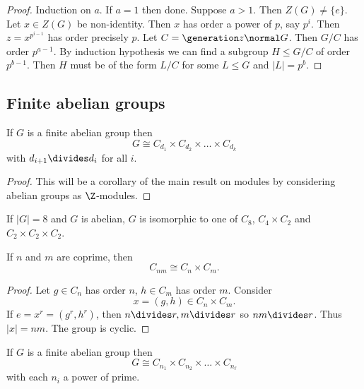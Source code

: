 \documentclass[a4paper]{article}
\begin{document}
\begin{proof}
  Induction on \(a\). If \(a = 1\) then done. Suppose \(a > 1\). Then \(Z(G) \neq \{e\}\). Let \(x \in Z(G)\) be non-identity. Then \(x\) has order  a power of \(p\), say \(p^i\). Then \(z = x^{p^{i - 1}}\) has order precisely \(p\). Let \(C = \generation z \normal G\). Then \(G/C\) has order \(p^{a - 1}\). By induction hypothesis we can find a subgroup \(H \leq G/C\) of order \(p^{b - 1}\). Then \(H\) must be of the form \(L/C\) for some \(L \leq G\) and \(|L| = p^b\).
\end{proof}

\subsection{Finite abelian groups}

\begin{theorem}
  If \(G\) is a finite abelian group then
  \[
    G \cong C_{d_1} \times C_{d_2} \times \dots \times C_{d_k}
  \]
  with \(d_{i + 1} \divides d_i\) for all \(i\).
\end{theorem}

\begin{proof}
  This will be a corollary of the main result on modules by considering abelian groups as \(\Z\)-modules.
\end{proof}

\begin{eg}
  If \(|G| = 8\) and \(G\) is abelian, \(G\) is isomorphic to one of \(C_8\), \(C_4 \times C_2\) and \(C_2 \times C_2 \times C_2\).
\end{eg}

\begin{lemma}
  If \(n\) and \(m\) are coprime, then
  \[
    C_{nm} \cong C_n \times C_m.
  \]
\end{lemma}

\begin{proof}
  Let \(g \in C_n\) has order \(n\), \(h \in C_m\) has order \(m\). Consider
  \[
    x = (g, h) \in C_n \times C_m.
  \]
  If \(e = x^r = (g^r, h^r)\), then \(n \divides r, m \divides r\) so \(nm \divides r\). Thus \(|x| = nm\). The group is cyclic.
\end{proof}

\begin{corollary}
  If \(G\) is a finite abelian group then
  \[
    G \cong C_{n_1} \times C_{n_2} \times \dots \times C_{n_\ell}
  \]
  with each \(n_i\) a power of prime.
\end{corollary}
\end{document}
